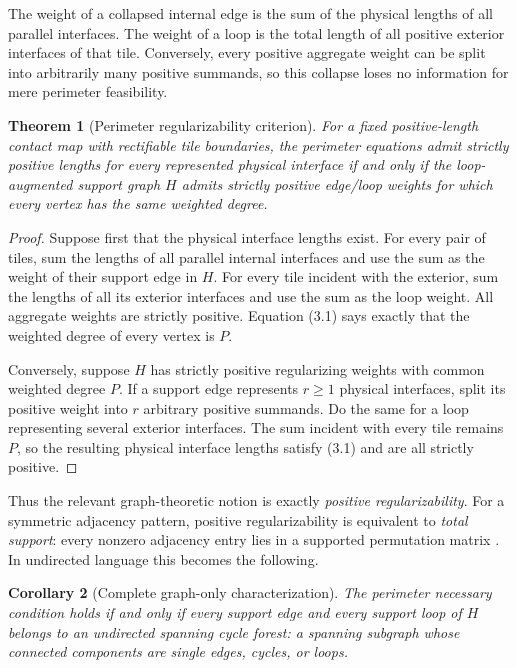 \documentclass[11pt]{article}
\newtheorem{theorem}{Theorem}[section]
\newtheorem{corollary}[theorem]{Corollary}
\theoremstyle{definition}
\theoremstyle{remark}
\begin{document}
The weight of a collapsed internal edge is the sum of the physical lengths of all parallel interfaces.  The weight of a loop is the total length of all positive exterior interfaces of that tile.  Conversely, every positive aggregate weight can be split into arbitrarily many positive summands, so this collapse loses no information for mere perimeter feasibility.

\begin{theorem}[Perimeter regularizability criterion]
\label{thm:perimeter-regularizability}
For a fixed positive-length contact map with rectifiable tile boundaries, the perimeter equations \emph{admit strictly positive lengths for every represented physical interface} if and only if the loop-augmented support graph $H$ admits strictly positive edge/loop weights for which every vertex has the same weighted degree.
\end{theorem}

\begin{proof}
Suppose first that the physical interface lengths exist.  For every pair of tiles, sum the lengths of all parallel internal interfaces and use the sum as the weight of their support edge in $H$.  For every tile incident with the exterior, sum the lengths of all its exterior interfaces and use the sum as the loop weight.  All aggregate weights are strictly positive.  Equation (3.1) says exactly that the weighted degree of every vertex is $P$.

Conversely, suppose $H$ has strictly positive regularizing weights with common weighted degree $P$.  If a support edge represents $r\ge1$ physical interfaces, split its positive weight into $r$ arbitrary positive summands.  Do the same for a loop representing several exterior interfaces.  The sum incident with every tile remains $P$, so the resulting physical interface lengths satisfy (3.1) and are all strictly positive.
\end{proof}

Thus the relevant graph-theoretic notion is exactly \emph{positive regularizability}.  For a symmetric adjacency pattern, positive regularizability is equivalent to \emph{total support}: every nonzero adjacency entry lies in a supported permutation matrix \cite{BozzoFranceschet2016}.  In undirected language this becomes the following.

\begin{corollary}[Complete graph-only characterization]
\label{cor:cycle-forest}
The perimeter necessary condition holds if and only if every support edge and every support loop of $H$ belongs to an undirected spanning cycle forest: a spanning subgraph whose connected components are single edges, cycles, or loops.
\end{corollary}
\end{document}
